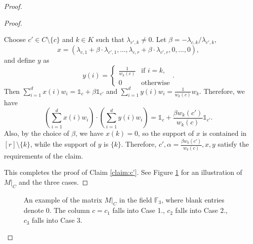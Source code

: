 \begin{proof}
\begin{proof}
\begin{description}
				Choose $c' \in C \setminus \{c\}$ and $k\in K$ such that $\lambda_{c',k}\neq 0$. Let $\beta=-\lambda_{c,k}/\lambda_{c',k}$, 
				$$x=(\lambda_{c,1}+\beta\cdot \lambda_{c',1},\dots,\lambda_{c,r}+\beta\cdot\lambda_{c',r},0,\dots,0),$$ and define $y$ as
				$$y(i)=\begin{cases}\frac{1}{w_k(c)} &\mbox{if }i=k,\\
					0                &\mbox{otherwise}
				\end{cases}.$$
				Then $\sum_{i=1}^d x(i)w_i=\mathds{1}_c+\beta \mathds{1}_{c'}$ and $\sum_{i=1}^d y(i)w_i=\frac{1}{w_k(c)}w_k$. Therefore, we have 
				$$\left(\sum_{i=1}^d x(i)w_i\right)\cdot \left(\sum_{i=1}^d y(i)w_i\right)=\mathds{1}_c+\frac{\beta w_k(c')}{w_k(c)}\mathds{1}_{c'}.$$ Also, by the choice of $\beta$, we have $x(k)=0$, so the support of $x$ is contained in $[r]\setminus\{k\}$, while the support of $y$ is $\{k\}$. Therefore, $c',\alpha=\frac{\beta w_k(c')}{w_k(c)},x,y$ satisfy the requirements of the claim.
			\end{description}
			This completes the proof of Claim \ref{claim:c'}. See Figure \ref{fig2} for an illustration of $M|_{C}$ and the three cases.
		\end{proof}
		
		\begin{figure}
			\centering
			\caption{An example of the matrix $M|_{C}$ in the field $\mathbb{F}_3$, where blank entries denote 0. The column $c=c_1$ falls into Case 1., $c_2$ falls into Case 2., $c_3$ falls into Case 3.}
			\label{fig2}
		\end{figure}
		

\end{proof}
